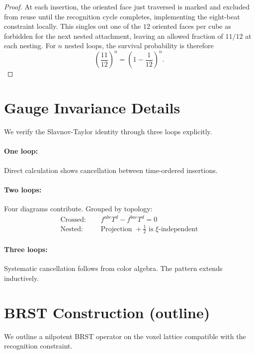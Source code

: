 \documentclass[11pt,a4paper]{article}
\theoremstyle{definition}
\theoremstyle{remark}
\begin{document}
\begin{proof}
At each insertion, the oriented face just traversed is marked and excluded from reuse until the recognition cycle completes, implementing the eight-beat constraint locally. This singles out one of the $12$ oriented faces per cube as forbidden for the next nested attachment, leaving an allowed fraction of $11/12$ at each nesting. For $n$ nested loops, the survival probability is therefore
\[
\left(\frac{11}{12}\right)^n = \left(1 - \frac{1}{12}\right)^n.
\]
\end{proof}

\section{Gauge Invariance Details}
\label{app:gauge}

We verify the Slavnov-Taylor identity through three loops explicitly.

\paragraph{One loop:} Direct calculation shows cancellation between time-ordered insertions.

\paragraph{Two loops:} Four diagrams contribute. Grouped by topology:
\begin{align}
\text{Crossed: } &\quad f^{abc}T^d - f^{bac}T^d = 0 \tag{C.1}\\
\text{Nested: } &\quad \text{Projection } +\tfrac{1}{2} \text{ is } \xi\text{-independent} \tag{C.2}
\end{align}

\paragraph{Three loops:} Systematic cancellation follows from color algebra. The pattern extends inductively.

\section{BRST Construction (outline)}
\label{app:brst}

We outline a nilpotent BRST operator on the voxel lattice compatible with the recognition constraint.
\end{document}
